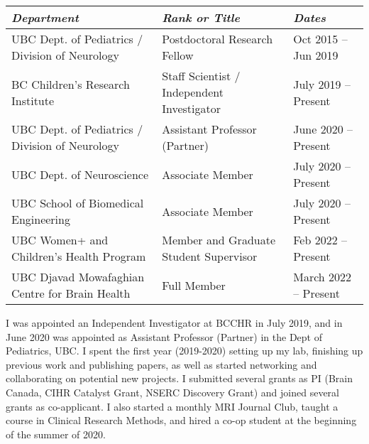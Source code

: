 \documentclass[11pt,notitlepage,english]{report}
\begin{document}
\begin{table}[H]
  \begin{tabularx}{1\textwidth}{|p{8cm}|p{5cm}|X|}
    \hline
    \textit{Department}                             & \textit{Rank or Title}                     & \textit{Dates}       \\
    \hline
    UBC Dept. of Pediatrics / Division of Neurology & Postdoctoral Research Fellow               & Oct 2015 – Jun 2019  \\
    \hline
    BC Children’s Research Institute                & Staff Scientist / Independent Investigator & July 2019 – Present  \\
    \hline
    UBC Dept. of Pediatrics / Division of Neurology & Assistant Professor (Partner)              & June 2020 – Present  \\
    \hline
    UBC Dept. of Neuroscience                       & Associate Member                           & July 2020 – Present  \\
    \hline
    UBC School of Biomedical Engineering            & Associate Member                           & July 2020 – Present  \\
    \hline
    UBC Women+ and Children’s Health Program        & Member and Graduate Student Supervisor     & Feb 2022 – Present   \\
    \hline
    UBC Djavad Mowafaghian Centre for Brain Health  & Full Member                                & March 2022 – Present \\
    \hline
  \end{tabularx}
\end{table}

I was appointed an Independent Investigator at BCCHR in July 2019, and in June 2020 was appointed as Assistant Professor (Partner) in the Dept of Pediatrics, UBC. I spent the first year (2019-2020) setting up my lab, finishing up previous work and publishing papers, as well as started networking and collaborating on potential new projects. I submitted several grants as PI (Brain Canada, CIHR Catalyst Grant, NSERC Discovery Grant) and joined several grants as co-applicant. I also started a monthly MRI Journal Club, taught a course in Clinical Research Methods, and hired a co-op student at the beginning of the summer of 2020.
\\
\end{document}
